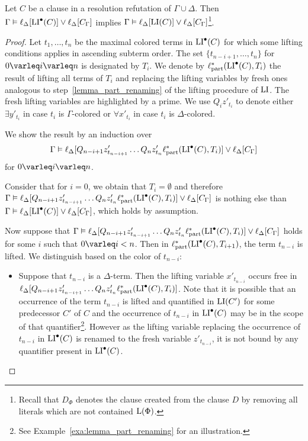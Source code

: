 \begin{lemma}
	\label{lemma:lipre_implies_li}
	Let $C$ be a clause in a resolution refutation of $\Gamma \cup \Delta$.
	Then
	$\Gamma \vDash \ell_{\Delta}[ \operatorname{LI}^\bullet(C) ] \lor \ell_{\Delta}[C_\Gamma]$
	implies 
	$\Gamma \vDash \ell_{\Delta}[ \operatorname{LI}(C) ] \lor \ell_{\Delta}[C_\Gamma]$\footnote{Recall that $D_\Phi$ denotes the clause created from the clause $D$ by removing all literals which are not contained $\operatorname{L}(\Phi)$.}.
\end{lemma}
\begin{proof}
	Let $t_1, \dots, t_n$ be the maximal colored terms in $\operatorname{LI}^\bullet(C)$ for which some lifting conditions applies in ascending subterm order. The set $\{t_{n-i+1}, \dots, t_n \}$  for $0\varleq i \varleq n$ is designated by $T_i$.
	We denote by $\ell_\mathrm{part}^*(\operatorname{LI}^\bullet(C), T_i)$ the result of lifting all terms of $T_i$ and replacing the lifting variables by fresh ones analogous to step~\ref{lemma_part_renaming} of the lifting procedure of $\operatorname{LI}$.
	The fresh lifting variables are highlighted by a prime.
	We use $Q_i z'_{t_i}$ to denote either $\exists y'_{t_i}$ in case $t_i$ is $\Gamma$-colored or $\forall x'_{t_i}$ in case $t_i$ is $\Delta$-colored.

	We show the result by an induction over \[\Gamma \vDash \ell_{\Delta}[ Q_{n-i+1} z'_{t_{n-i+1}} \dots Q_n z'_{t_n} \ell_\mathrm{part}^*( \operatorname{LI}^\bullet(C), T_i )] \lor \ell_{\Delta}[C_\Gamma]\] for $ 0 \varleq i\varleq n$.

	Consider that 
	for $i=0$, we obtain that  $T_i = \emptyset$ and therefore
	$\Gamma \vDash \ell_{\Delta}[ Q_{n-i+1} z'_{t_{n-i+1}} \dots Q_n z'_{t_n} \ell_\mathrm{part}^*( \operatorname{LI}^\bullet(C), T_i )] \lor \ell_{\Delta}[C_\Gamma]$ is nothing else than $\Gamma \vDash \ell_{\Delta}[\operatorname{LI}^\bullet(C)] \lor \ell_{\Delta}[C_\Gamma]$, which holds by assumption.

	Now suppose that $\Gamma \vDash \ell_{\Delta}[ Q_{n-i+1} z'_{t_{n-i+1}} \dots Q_n z'_{t_n} \ell_\mathrm{part}^*( \operatorname{LI}^\bullet(C), T_i )] \lor \ell_{\Delta}[C_\Gamma]$ holds for some $i$ such that $0\varleq i < n$.
	Then in $\ell_\mathrm{part}^*( \operatorname{LI}^\bullet(C), T_{i+1} )$, the term $t_{n-i}$ is lifted.
	We distinguish based on the color of $t_{n-i}$:
	\begin{itemize}
		\item
			Suppose that $t_{n-i}$ is a $\Delta$-term.
			Then the lifting variable $x'_{t_{n-i}}$ occurs free in $\ell_{\Delta}[ Q_{n-i+1} z'_{t_{n-i+1}} \dots Q_n z'_{t_n} \ell_\mathrm{part}^*( \operatorname{LI}^\bullet(C), T_i )]$.
			Note that it is possible that an occurrence of the term $t_{n-i}$ is lifted and quantified in $\operatorname{LI}(C')$ for some predecessor $C'$ of $C$ and the occurrence of $t_{n-i}$ in $\operatorname{LI}^\bullet(C)$ may be in the scope of that quantifier\footnote{See Example~\ref{exa:lemma_part_renaming} for an illustration.}. 
			However as the lifting variable replacing the occurrence of $t_{n-i}$ in $\operatorname{LI}^\bullet(C)$ is renamed to the fresh variable $z'_{t_{n-i}}$, it is not bound by any quantifier present in $\operatorname{LI}^\bullet(C)$.



\end{itemize}
\end{proof}
